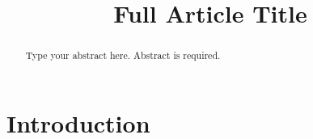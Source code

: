 \documentclass{dmgt}
\title{Full Article Title}%
\begin{document}
\begin{abstract}
Type your abstract here. Abstract is required. 
\end{abstract}

\section{Introduction}


\begin{thebibliography}{99}

\end{thebibliography}
\end{document}
